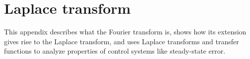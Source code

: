 
\chapter{Laplace transform}
\label{ch:laplace_transform}

This appendix describes what the Fourier transform is, shows how its extension
gives rise to the Laplace transform, and uses Laplace transforms and transfer
functions to analyze properties of control systems like
\gls{steady-state error}.

\renewcommand*{\chapterpath}{\partpath/laplace-transform}



